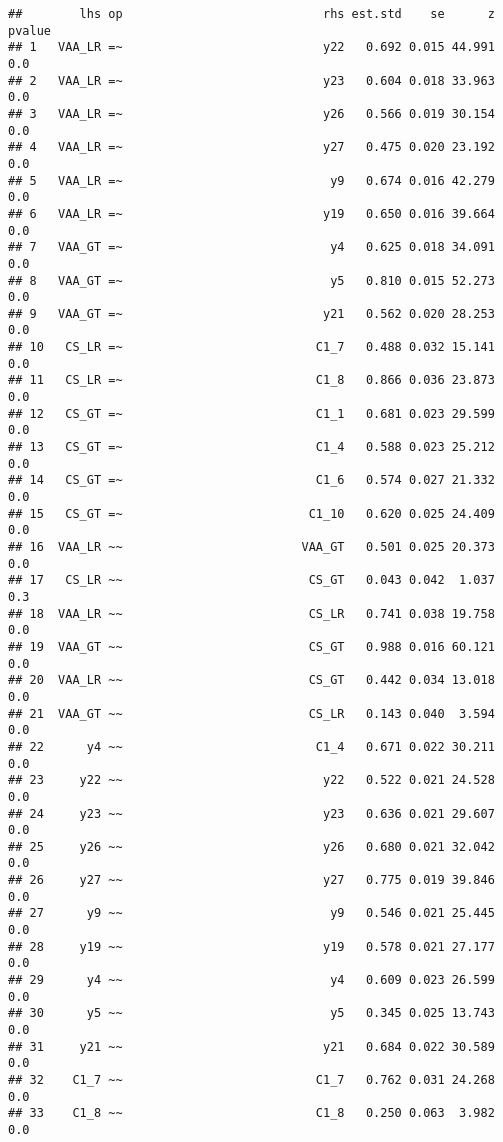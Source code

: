 \documentclass[
]{article}
\begin{document}
\begin{verbatim}
##        lhs op                            rhs est.std    se      z pvalue
## 1   VAA_LR =~                            y22   0.692 0.015 44.991    0.0
## 2   VAA_LR =~                            y23   0.604 0.018 33.963    0.0
## 3   VAA_LR =~                            y26   0.566 0.019 30.154    0.0
## 4   VAA_LR =~                            y27   0.475 0.020 23.192    0.0
## 5   VAA_LR =~                             y9   0.674 0.016 42.279    0.0
## 6   VAA_LR =~                            y19   0.650 0.016 39.664    0.0
## 7   VAA_GT =~                             y4   0.625 0.018 34.091    0.0
## 8   VAA_GT =~                             y5   0.810 0.015 52.273    0.0
## 9   VAA_GT =~                            y21   0.562 0.020 28.253    0.0
## 10   CS_LR =~                           C1_7   0.488 0.032 15.141    0.0
## 11   CS_LR =~                           C1_8   0.866 0.036 23.873    0.0
## 12   CS_GT =~                           C1_1   0.681 0.023 29.599    0.0
## 13   CS_GT =~                           C1_4   0.588 0.023 25.212    0.0
## 14   CS_GT =~                           C1_6   0.574 0.027 21.332    0.0
## 15   CS_GT =~                          C1_10   0.620 0.025 24.409    0.0
## 16  VAA_LR ~~                         VAA_GT   0.501 0.025 20.373    0.0
## 17   CS_LR ~~                          CS_GT   0.043 0.042  1.037    0.3
## 18  VAA_LR ~~                          CS_LR   0.741 0.038 19.758    0.0
## 19  VAA_GT ~~                          CS_GT   0.988 0.016 60.121    0.0
## 20  VAA_LR ~~                          CS_GT   0.442 0.034 13.018    0.0
## 21  VAA_GT ~~                          CS_LR   0.143 0.040  3.594    0.0
## 22      y4 ~~                           C1_4   0.671 0.022 30.211    0.0
## 23     y22 ~~                            y22   0.522 0.021 24.528    0.0
## 24     y23 ~~                            y23   0.636 0.021 29.607    0.0
## 25     y26 ~~                            y26   0.680 0.021 32.042    0.0
## 26     y27 ~~                            y27   0.775 0.019 39.846    0.0
## 27      y9 ~~                             y9   0.546 0.021 25.445    0.0
## 28     y19 ~~                            y19   0.578 0.021 27.177    0.0
## 29      y4 ~~                             y4   0.609 0.023 26.599    0.0
## 30      y5 ~~                             y5   0.345 0.025 13.743    0.0
## 31     y21 ~~                            y21   0.684 0.022 30.589    0.0
## 32    C1_7 ~~                           C1_7   0.762 0.031 24.268    0.0
## 33    C1_8 ~~                           C1_8   0.250 0.063  3.982    0.0

\end{verbatim}
\end{document}
